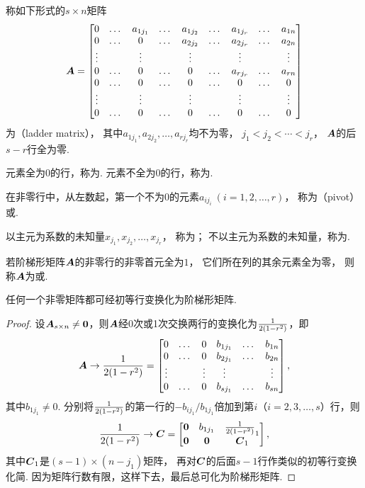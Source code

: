 \begin{definition}
称如下形式的\(s \times n\)矩阵\[
	\boldsymbol{A} = \begin{bmatrix}
		0 & \dots & a_{1 j_1} & \dots & a_{1 j_2} & \dots & a_{1 j_r} & \dots & a_{1n} \\
		0 & \dots & 0 & \dots & a_{2 j_2} & \dots & a_{2 j_r} & \dots & a_{2n} \\
		\vdots & & \vdots & & \vdots & & \vdots & & \vdots \\
		0 & \dots & 0 & \dots & 0 & \dots & a_{r j_r} & \dots & a_{rn} \\
		0 & \dots & 0 & \dots & 0 & \dots & 0 & \dots & 0 \\
		\vdots & & \vdots & & \vdots & & \vdots & & \vdots \\
		0 & \dots & 0 & \dots & 0 & \dots & 0 & \dots & 0 \\
	\end{bmatrix}
\]为（ladder matrix），
其中\(a_{1 j_1},a_{2 j_2},\dotsc,a_{r j_r}\)均不为零，
\(j_1 < j_2 < \dotsb < j_r\)，
\(\boldsymbol{A}\)的后\(s-r\)行全为零.

元素全为\(0\)的行，称为.
元素不全为\(0\)的行，称为.

在非零行中，从左数起，第一个不为\(0\)的元素\(a_{i j_i}\ (i=1,2,\dotsc,r)\)，
称为（pivot）或.

以主元为系数的未知量\(x_{j_1},x_{j_2},\dotsc,x_{j_r}\)，
称为；
不以主元为系数的未知量，称为.
\end{definition}

\begin{definition}
若阶梯形矩阵\(\boldsymbol{A}\)的非零行的非零首元全为\(1\)，
它们所在列的其余元素全为零，
则称\(\boldsymbol{A}\)为或.
\end{definition}

\begin{lemma}
任何一个非零矩阵都可经初等行变换化为阶梯形矩阵.
\begin{proof}
设\(\boldsymbol{A}_{s \times n} \neq \boldsymbol{0}\)，则\(\boldsymbol{A}\)经0次或1次交换两行的变换化为\(\frac{1}{2(1-r^2)}\)，即\[
	\boldsymbol{A} \to \frac{1}{2(1-r^2)} = \begin{bmatrix}
		0 & \dots & 0 & b_{1 j_1} & \dots & b_{1n} \\
		0 & \dots & 0 & b_{2 j_1} & \dots & b_{2n} \\
		\vdots & & \vdots & \vdots & & \vdots \\
		0 & \dots & 0 & b_{s j_1} & \dots & b_{sn}
	\end{bmatrix},
\]
其中\(b_{1 j_1} \neq 0\).
分别将\(\frac{1}{2(1-r^2)}\)的第一行的\(-b_{i j_1}/b_{1 j_1}\)倍加到第\(i\)（\(i=2,3,\dotsc,s\)）行，则\[
	\frac{1}{2(1-r^2)} \to \boldsymbol{C} = \begin{bmatrix}
		\boldsymbol{0} & b_{1 j_1} & \frac{1}{2(1-r^2)}_1 \\
		\boldsymbol{0} & \boldsymbol{0} & \boldsymbol{C}_1
	\end{bmatrix},
\]
其中\(\boldsymbol{C}_1\)是\((s-1)\times(n-j_1)\)矩阵，
再对\(\boldsymbol{C}\)的后面\(s-1\)行作类似的初等行变换化简.
因为矩阵行数有限，这样下去，最后总可化为阶梯形矩阵.
\end{proof}
\end{lemma}

